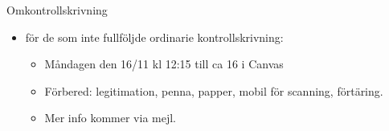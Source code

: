 \begin{Slide}{Omkontrollskrivning}
  \begin{itemize}
    \item {} för de som inte fullföljde ordinarie kontrollskrivning:
    \begin{itemize}
      \item Måndagen den 16/11 kl 12:15 till ca 16 i Canvas
      \item Förbered: legitimation, penna, papper, mobil för scanning, förtäring. 
      \item Mer info kommer via mejl.
    \end{itemize}
  \end{itemize}
\end{Slide}

    
